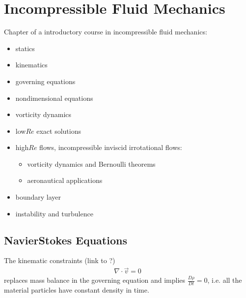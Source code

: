 \documentclass[letterpaper,10pt,english]{jupyterBook}
\begin{document}
\chapter{Incompressible Fluid Mechanics}
\label{\detokenize{ch/fluids/incompressible:incompressible-fluid-mechanics}}\label{\detokenize{ch/fluids/incompressible:fluid-mechanics-incompressible}}\label{\detokenize{ch/fluids/incompressible::doc}}
\sphinxAtStartPar
Chapter of a introductory course in incompressible fluid mechanics:
\begin{itemize}
\item {} 
\sphinxAtStartPar
statics

\item {} 
\sphinxAtStartPar
kinematics

\item {} 
\sphinxAtStartPar
governing equations

\item {} 
\sphinxAtStartPar
non\sphinxhyphen{}dimensional equations

\item {} 
\sphinxAtStartPar
vorticity dynamics

\item {} 
\sphinxAtStartPar
low\sphinxhyphen{}\(Re\) exact solutions

\item {} 
\sphinxAtStartPar
high\sphinxhyphen{}\(Re\) flows, incompressible inviscid irrotational flows:
\begin{itemize}
\item {} 
\sphinxAtStartPar
vorticity dynamics and Bernoulli theorems

\item {} 
\sphinxAtStartPar
aeronautical applications

\end{itemize}

\item {} 
\sphinxAtStartPar
boundary layer

\item {} 
\sphinxAtStartPar
instability and turbulence

\end{itemize}


\section{Navier\sphinxhyphen{}Stokes Equations}
\label{\detokenize{ch/fluids/incompressible:navier-stokes-equations}}\label{\detokenize{ch/fluids/incompressible:fluid-mechanics-incompressible-ns-eqn}}
\sphinxAtStartPar
The kinematic constraints (link to {\hyperref[\detokenize{ch/fluids/dimensional-analysis:fluid-mechanics-dimensional-analysis}]{}}?)
\begin{equation*}
\begin{split}\nabla \cdot \vec{v} = 0\end{split}
\end{equation*}
\sphinxAtStartPar
replaces mass balance in the governing equation and implies \(\frac{D \rho}{D t} = 0\), i.e. all the material particles have constant density in time.
\end{document}
